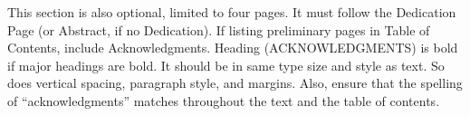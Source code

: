%
%
%


\begin{acknowledgements}

This section is also optional, limited to four pages. It must follow the Dedication Page (or Abstract, if no Dedication). If listing preliminary pages in Table of Contents, include Acknowledgments. Heading (\MakeUppercase{Acknowledgments}) is bold if major headings are bold. It should be in same type size and style as text. So does vertical spacing, paragraph style, and margins. Also, ensure that the spelling of ``acknowledgments'' matches throughout the text and the table of contents.

\end{acknowledgements}